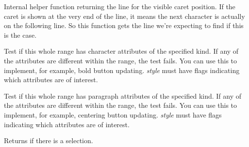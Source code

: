 
Internal helper function returning the line for the visible caret position. If the caret is
shown at the very end of the line, it means the next character is actually
on the following line. So this function gets the line we're expecting to find
if this is the case.

\label{wxrichtextctrlhascharacterattributes}



Test if this whole range has character attributes of the specified kind. If any
of the attributes are different within the range, the test fails. You
can use this to implement, for example, bold button updating. {\it style} must have
flags indicating which attributes are of interest.

\label{wxrichtextctrlhasparagraphattributes}



Test if this whole range has paragraph attributes of the specified kind. If any
of the attributes are different within the range, the test fails. You
can use this to implement, for example, centering button updating. {\it style} must have
flags indicating which attributes are of interest.

\label{wxrichtextctrlhasselection}


Returns \true if there is a selection.

\label{wxrichtextctrlhittest}



